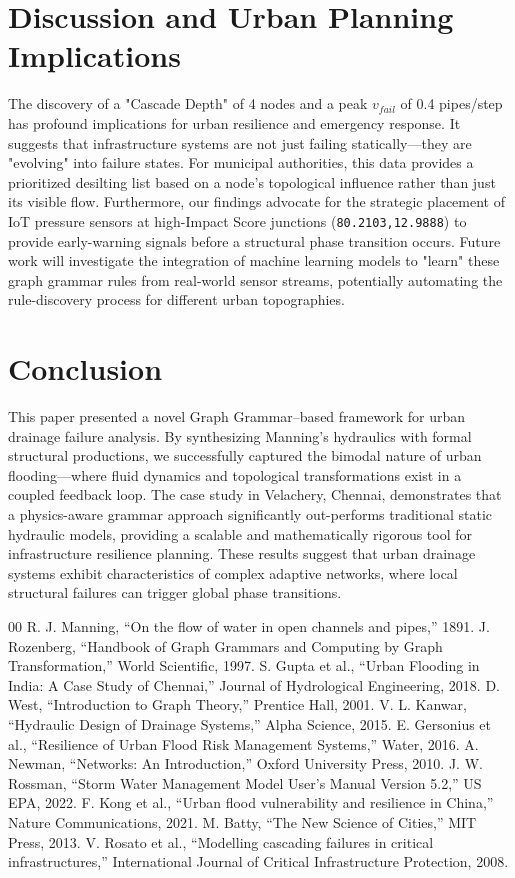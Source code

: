 \documentclass[conference]{IEEEtran}
\begin{document}
\section{Discussion and Urban Planning Implications}
The discovery of a "Cascade Depth" of 4 nodes and a peak $v_{fail}$ of 0.4 pipes/step has profound implications for urban resilience and emergency response. It suggests that infrastructure systems are not just failing statically—they are "evolving" into failure states. For municipal authorities, this data provides a prioritized desilting list based on a node's topological influence rather than just its visible flow. Furthermore, our findings advocate for the strategic placement of IoT pressure sensors at high-Impact Score junctions (\texttt{80.2103,12.9888}) to provide early-warning signals before a structural phase transition occurs. Future work will investigate the integration of machine learning models to "learn" these graph grammar rules from real-world sensor streams, potentially automating the rule-discovery process for different urban topographies.

\section{Conclusion}
This paper presented a novel Graph Grammar--based framework for urban drainage failure analysis. By synthesizing Manning's hydraulics with formal structural productions, we successfully captured the bimodal nature of urban flooding—where fluid dynamics and topological transformations exist in a coupled feedback loop. The case study in Velachery, Chennai, demonstrates that a physics-aware grammar approach significantly out-performs traditional static hydraulic models, providing a scalable and mathematically rigorous tool for infrastructure resilience planning. These results suggest that urban drainage systems exhibit characteristics of complex adaptive networks, where local structural failures can trigger global phase transitions. 

\begin{thebibliography}{00}
 R. J. Manning, ``On the flow of water in open channels and pipes,'' 1891.
 J. Rozenberg, ``Handbook of Graph Grammars and Computing by Graph Transformation,'' World Scientific, 1997.
 S. Gupta et al., ``Urban Flooding in India: A Case Study of Chennai,'' Journal of Hydrological Engineering, 2018.
 D. West, ``Introduction to Graph Theory,'' Prentice Hall, 2001.
 V. L. Kanwar, ``Hydraulic Design of Drainage Systems,'' Alpha Science, 2015.
 E. Gersonius et al., ``Resilience of Urban Flood Risk Management Systems,'' Water, 2016.
 A. Newman, ``Networks: An Introduction,'' Oxford University Press, 2010.
 J. W. Rossman, ``Storm Water Management Model User's Manual Version 5.2,'' US EPA, 2022.
 F. Kong et al., ``Urban flood vulnerability and resilience in China,'' Nature Communications, 2021.
 M. Batty, ``The New Science of Cities,'' MIT Press, 2013.
 V. Rosato et al., ``Modelling cascading failures in critical infrastructures,'' International Journal of Critical Infrastructure Protection, 2008.
\end{thebibliography}
\end{document}
